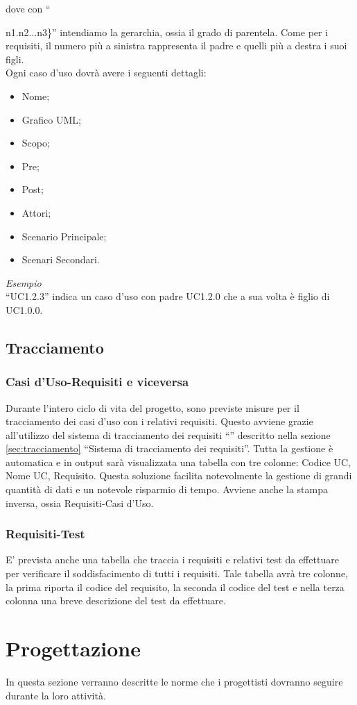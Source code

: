 dove con ``{n1.n2...n3\}'' intendiamo la gerarchia, ossia il grado di parentela. Come per i requisiti, il numero più a sinistra rappresenta il padre e quelli più a destra i suoi figli.\\
Ogni caso d'uso dovrà avere i seguenti dettagli:
\begin{itemize}
\item Nome;
\item Grafico UML;
\item Scopo;
\item Pre;
\item Post;
\item Attori;
\item Scenario Principale;
\item Scenari Secondari.    
\end{itemize}
\textit{Esempio}\\
``UC1.2.3'' indica un caso d'uso con padre UC1.2.0 che a sua volta è figlio di UC1.0.0.

\subsection{Tracciamento}
\subsubsection{Casi d'Uso-Requisiti e viceversa}
Durante l'intero ciclo di vita del progetto, sono previste misure per il tracciamento dei casi d'uso con i relativi requisiti. Questo avviene grazie all'utilizzo del sistema di tracciamento dei requisiti ``\manager{}'' descritto nella sezione \ref{sec:tracciamento} ``Sistema di tracciamento dei requisiti''. Tutta la gestione è automatica e in output sarà visualizzata una tabella con tre colonne: Codice UC, Nome UC, Requisito. Questa soluzione facilita notevolmente la gestione di grandi quantità di dati e un notevole risparmio di tempo. Avviene anche la stampa inversa, ossia Requisiti-Casi d'Uso.
\subsubsection{Requisiti-Test}
E' prevista anche una tabella che traccia i requisiti e relativi test da effettuare per verificare il soddisfacimento di tutti i requisiti. Tale tabella avrà tre colonne, la prima riporta il codice del requisito, la seconda il codice del test e nella terza colonna una breve descrizione del test da effettuare.

\newpage
\section{Progettazione}
\label{sec:progettazione}
In questa sezione verranno descritte le norme che i progettisti dovranno seguire durante la loro attività.

}
